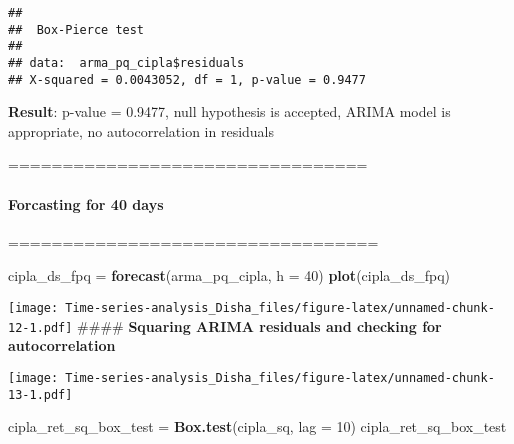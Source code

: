 \documentclass[
]{article}
\newenvironment{Shaded}{\begin{snugshade}}{\end{snugshade}}
\newcommand{\AttributeTok}[1]{\textcolor[rgb]{0.13,0.29,0.53}{#1}}
\newcommand{\DecValTok}[1]{\textcolor[rgb]{0.00,0.00,0.81}{#1}}
\newcommand{\FunctionTok}[1]{\textcolor[rgb]{0.13,0.29,0.53}{\textbf{#1}}}
\newcommand{\NormalTok}[1]{#1}
\newcommand{\OtherTok}[1]{\textcolor[rgb]{0.56,0.35,0.01}{#1}}
\newcommand{\SpecialCharTok}[1]{\textcolor[rgb]{0.81,0.36,0.00}{\textbf{#1}}}
\begin{document}
\begin{verbatim}
## 
##  Box-Pierce test
## 
## data:  arma_pq_cipla$residuals
## X-squared = 0.0043052, df = 1, p-value = 0.9477
\end{verbatim}

\textbf{Result}: p-value = 0.9477, null hypothesis is accepted, ARIMA
model is appropriate, no autocorrelation in residuals

=================================

\hypertarget{forcasting-for-40-days}{%
\paragraph{\texorpdfstring{\textbf{Forcasting for 40
days}}{Forcasting for 40 days}}\label{forcasting-for-40-days}}

==================================

\begin{Shaded}
\begin{Highlighting}[]
\NormalTok{cipla\_ds\_fpq }\OtherTok{=} \FunctionTok{forecast}\NormalTok{(arma\_pq\_cipla, }\AttributeTok{h =} \DecValTok{40}\NormalTok{)}
\FunctionTok{plot}\NormalTok{(cipla\_ds\_fpq)}
\end{Highlighting}
\end{Shaded}

\texttt{[image: Time-series-analysis\_Disha\_files/figure-latex/unnamed-chunk-12-1.pdf]}
\#\#\#\# \textbf{Squaring ARIMA residuals and checking for
autocorrelation}

\begin{Shaded}
\end{Shaded}

\texttt{[image: Time-series-analysis\_Disha\_files/figure-latex/unnamed-chunk-13-1.pdf]}

\begin{Shaded}
\begin{Highlighting}[]
\NormalTok{cipla\_ret\_sq\_box\_test }\OtherTok{=} \FunctionTok{Box.test}\NormalTok{(cipla\_sq, }\AttributeTok{lag =} \DecValTok{10}\NormalTok{)}
\NormalTok{cipla\_ret\_sq\_box\_test}
\end{Highlighting}
\end{Shaded}
\end{document}
